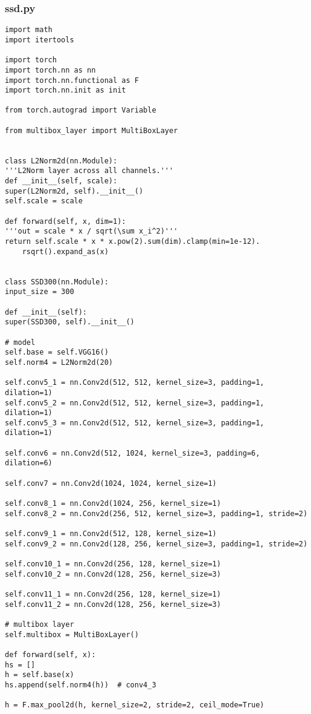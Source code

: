 \subsubsection*{ssd.py}
\begin{lstlisting}
import math
import itertools

import torch
import torch.nn as nn
import torch.nn.functional as F
import torch.nn.init as init

from torch.autograd import Variable

from multibox_layer import MultiBoxLayer


class L2Norm2d(nn.Module):
'''L2Norm layer across all channels.'''
def __init__(self, scale):
super(L2Norm2d, self).__init__()
self.scale = scale

def forward(self, x, dim=1):
'''out = scale * x / sqrt(\sum x_i^2)'''
return self.scale * x * x.pow(2).sum(dim).clamp(min=1e-12).
	rsqrt().expand_as(x)


class SSD300(nn.Module):
input_size = 300

def __init__(self):
super(SSD300, self).__init__()

# model
self.base = self.VGG16()
self.norm4 = L2Norm2d(20)

self.conv5_1 = nn.Conv2d(512, 512, kernel_size=3, padding=1, dilation=1)
self.conv5_2 = nn.Conv2d(512, 512, kernel_size=3, padding=1, dilation=1)
self.conv5_3 = nn.Conv2d(512, 512, kernel_size=3, padding=1, dilation=1)

self.conv6 = nn.Conv2d(512, 1024, kernel_size=3, padding=6, dilation=6)

self.conv7 = nn.Conv2d(1024, 1024, kernel_size=1)

self.conv8_1 = nn.Conv2d(1024, 256, kernel_size=1)
self.conv8_2 = nn.Conv2d(256, 512, kernel_size=3, padding=1, stride=2)

self.conv9_1 = nn.Conv2d(512, 128, kernel_size=1)
self.conv9_2 = nn.Conv2d(128, 256, kernel_size=3, padding=1, stride=2)

self.conv10_1 = nn.Conv2d(256, 128, kernel_size=1)
self.conv10_2 = nn.Conv2d(128, 256, kernel_size=3)

self.conv11_1 = nn.Conv2d(256, 128, kernel_size=1)
self.conv11_2 = nn.Conv2d(128, 256, kernel_size=3)

# multibox layer
self.multibox = MultiBoxLayer()

def forward(self, x):
hs = []
h = self.base(x)
hs.append(self.norm4(h))  # conv4_3

h = F.max_pool2d(h, kernel_size=2, stride=2, ceil_mode=True)


\end{lstlisting}
